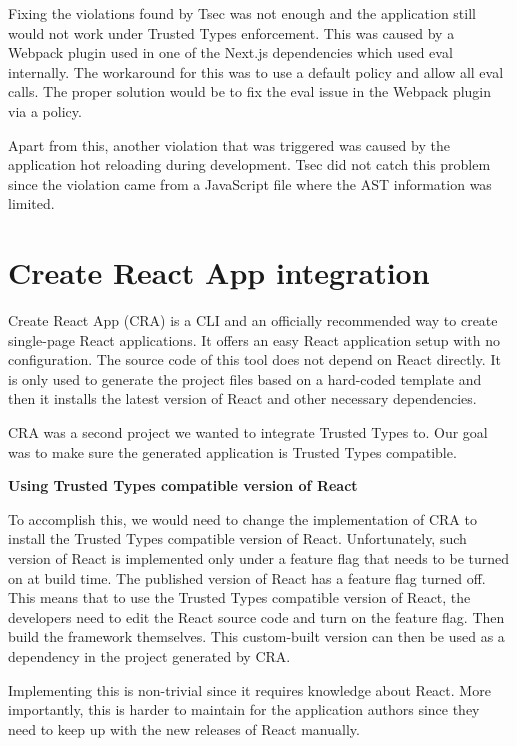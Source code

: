 Fixing the violations found by Tsec was not enough and the application still would not work under
Trusted Types enforcement. This was caused by a Webpack plugin used in one of the Next.js
dependencies which used eval internally. The workaround for this was to use a default policy and
allow all eval calls. The proper solution would be to fix the eval issue in the Webpack plugin via a
policy.

Apart from this, another violation that was triggered was caused by the application hot reloading
during development. Tsec did not catch this problem since the violation came from a JavaScript file
where the AST information was limited.

\section{Create React App integration}

Create React App (CRA) is a CLI and an officially recommended way to create single-page React
applications. It offers an easy React application setup with no configuration. The source code of
this tool does not depend on React directly. It is only used to generate the project files based on
a hard-coded template and then it installs the latest version of React and other necessary
dependencies.

CRA was a second project we wanted to integrate Trusted Types to. Our goal was to make sure the
generated application is Trusted Types compatible.

\medskip
\begin{flushleft}\textbf {Using Trusted Types compatible version of React}\end{flushleft}
\medskip

To accomplish this, we would need to change the implementation of CRA to install the Trusted Types
compatible version of React. Unfortunately, such version of React is implemented only under a
feature flag that needs to be turned on at build time. The published version of React has a feature
flag turned off. This means that to use the Trusted Types compatible version of React, the
developers need to edit the React source code and turn on the feature flag. Then build the framework
themselves. This custom-built version can then be used as a dependency in the project generated by
CRA.

Implementing this is non-trivial since it requires knowledge about React. More importantly, this is
harder to maintain for the application authors since they need to keep up with the new releases of
React manually.

